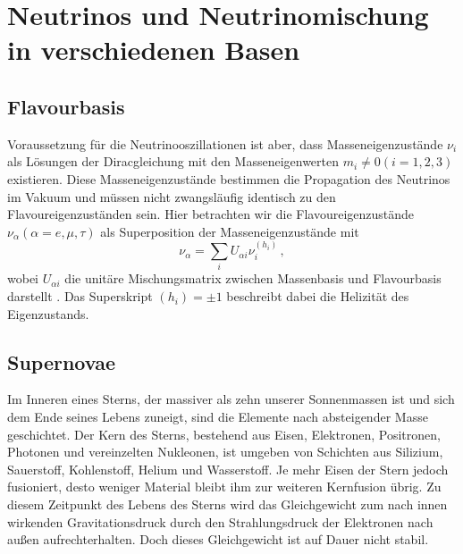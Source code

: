 \chapter{Neutrinos und Neutrinomischung in verschiedenen Basen}
\label{chap:neutrinobasen}

\section{Flavourbasis} %
\label{subsec:flavourbasis}
Voraussetzung für die Neutrinooszillationen ist aber, dass Masseneigenzustände $\nu_i$ als Lösungen der Diracgleichung mit den Masseneigenwerten $m_i \neq 0 (i = 1, 2, 3)$ existieren.
Diese Masseneigenzustände bestimmen die Propagation des Neutrinos im Vakuum und müssen nicht zwangsläufig identisch zu den Flavoureigenzuständen sein.
Hier betrachten wir die Flavoureigenzustände $\nu_\alpha (\alpha = e, \mu, \tau)$ als Superposition der Masseneigenzustände mit
\begin{equation}
    \nu_\alpha = \sum_i U_{\alpha i} \nu^{(h_i)}_i \,,
    \label{eq:flavourbasis}
\end{equation}
wobei $U_{\alpha i}$ die unitäre Mischungsmatrix zwischen Massenbasis und Flavourbasis darstellt \cite[Kap. 2.1]{oberauer}.
Das Superskript $(h_i) = \pm 1$ beschreibt dabei die Helizität des Eigenzustands.


\section{Supernovae}

Im Inneren eines Sterns, der massiver als zehn unserer Sonnenmassen ist und sich dem Ende seines Lebens zuneigt, sind die Elemente nach absteigender Masse geschichtet.
Der Kern des Sterns, bestehend aus Eisen, Elektronen, Positronen, Photonen und vereinzelten Nukleonen, ist umgeben von Schichten aus Silizium, Sauerstoff, Kohlenstoff, Helium und Wasserstoff.
Je mehr Eisen der Stern jedoch fusioniert, desto weniger Material bleibt ihm zur weiteren Kernfusion übrig.
Zu diesem Zeitpunkt des Lebens des Sterns wird das Gleichgewicht zum nach innen wirkenden Gravitationsdruck durch den Strahlungsdruck der Elektronen nach außen aufrechterhalten. 
Doch dieses Gleichgewicht ist auf Dauer nicht stabil.

